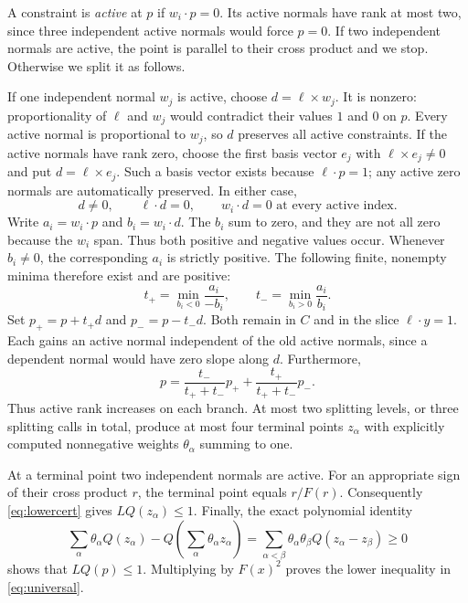 \documentclass[11pt,a4paper]{article}
\begin{document}
A constraint is \emph{active} at $p$ if $w_i\cdot p=0$. Its active normals have rank at most two, since three independent active normals would force $p=0$. If two independent normals are active, the point is parallel to their cross product and we stop. Otherwise we split it as follows.

If one independent normal $w_j$ is active, choose $d=\ell\times w_j$. It is nonzero: proportionality of $\ell$ and $w_j$ would contradict their values $1$ and $0$ on $p$. Every active normal is proportional to $w_j$, so $d$ preserves all active constraints. If the active normals have rank zero, choose the first basis vector $e_j$ with $\ell\times e_j\ne0$ and put $d=\ell\times e_j$. Such a basis vector exists because $\ell\cdot p=1$; any active zero normals are automatically preserved. In either case,
\[
 d\ne0,\qquad \ell\cdot d=0,\qquad w_i\cdot d=0\text{ at every active index}.
\]
Write $a_i=w_i\cdot p$ and $b_i=w_i\cdot d$. The $b_i$ sum to zero, and they are not all zero because the $w_i$ span. Thus both positive and negative values occur. Whenever $b_i\ne0$, the corresponding $a_i$ is strictly positive. The following finite, nonempty minima therefore exist and are positive:
\[
 t_+=\min_{b_i<0}\frac{a_i}{-b_i},\qquad
 t_-=\min_{b_i>0}\frac{a_i}{b_i}.
\]
Set $p_+=p+t_+d$ and $p_-=p-t_-d$. Both remain in $C$ and in the slice $\ell\cdot y=1$. Each gains an active normal independent of the old active normals, since a dependent normal would have zero slope along $d$. Furthermore,
\begin{equation}\label{eq:split}
 p=\frac{t_-}{t_++t_-}p_++\frac{t_+}{t_++t_-}p_-.
\end{equation}
Thus active rank increases on each branch. At most two splitting levels, or three splitting calls in total, produce at most four terminal points $z_\alpha$ with explicitly computed nonnegative weights $\theta_\alpha$ summing to one.

At a terminal point two independent normals are active. For an appropriate sign of their cross product $r$, the terminal point equals $r/F(r)$. Consequently \eqref{eq:lowercert} gives $LQ(z_\alpha)\le1$. Finally, the exact polynomial identity
\begin{equation}\label{eq:convexsquare}
 \sum_\alpha\theta_\alpha Q(z_\alpha)
 -Q\!\left(\sum_\alpha\theta_\alpha z_\alpha\right)
 =\sum_{\alpha<\beta}\theta_\alpha\theta_\beta Q(z_\alpha-z_\beta)\ge0
\end{equation}
shows that $LQ(p)\le1$. Multiplying by $F(x)^2$ proves the lower inequality in \eqref{eq:universal}.
\end{document}

